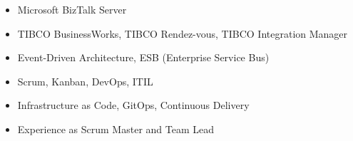 {\begin{itemize}
    \item Microsoft BizTalk Server
    \item TIBCO BusinessWorks, TIBCO Rendez-vous, TIBCO Integration Manager
    \item Event-Driven Architecture, ESB (Enterprise Service Bus)
\end{itemize}}

{\begin{itemize}
    \item Scrum, Kanban, DevOps, ITIL
    \item Infrastructure as Code, GitOps, Continuous Delivery
    \item Experience as Scrum Master and Team Lead
\end{itemize}}
